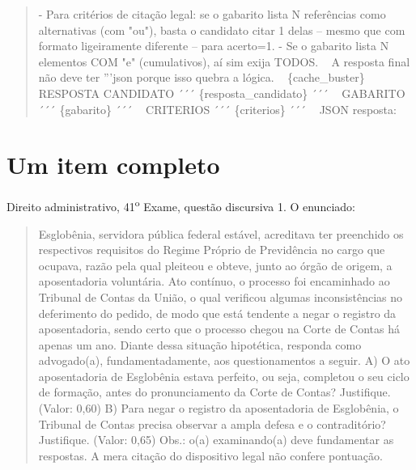 \documentclass{IOS-Book-Article}
\begin{document}
\begin{quote}
- Para critérios de citação legal: se o gabarito lista N referências como alternativas (com "ou"), basta o candidato citar 1 delas -- mesmo que com formato ligeiramente diferente -- para acerto=1.\newline
- Se o gabarito lista N elementos COM "e" (cumulativos), aí sim exija TODOS.\newline
~\newline
A resposta final não deve ter '''json porque isso quebra a lógica.\newline
~\newline
\{cache\_buster\}\newline
~\newline
RESPOSTA CANDIDATO\newline
´´´ \{resposta\_candidato\} ´´´\newline
~\newline
GABARITO\newline
´´´ \{gabarito\} ´´´\newline
~\newline
CRITERIOS\newline
´´´ \{criterios\} ´´´\newline
~\newline
JSON resposta:
\end{quote}

\section{Um item completo}

Direito administrativo, 41\textsuperscript{o} Exame, questão discursiva 1. O enunciado:

\begin{quote}\footnotesize\ttfamily\raggedright
Esglobênia, servidora pública federal estável, acreditava ter preenchido os respectivos requisitos do Regime Próprio de Previdência no cargo que ocupava, razão pela qual pleiteou e obteve, junto ao órgão de origem, a aposentadoria voluntária. Ato contínuo, o processo foi encaminhado ao Tribunal de Contas da União, o qual verificou algumas inconsistências no deferimento do pedido, de modo que está tendente a negar o registro da aposentadoria, sendo certo que o processo chegou na Corte de Contas há apenas um ano. Diante dessa situação hipotética, responda como advogado(a), fundamentadamente, aos questionamentos a seguir. A) O ato aposentadoria de Esglobênia estava perfeito, ou seja, completou o seu ciclo de formação, antes do pronunciamento da Corte de Contas? Justifique. (Valor: 0,60) B) Para negar o registro da aposentadoria de Esglobênia, o Tribunal de Contas precisa observar a ampla defesa e o contraditório? Justifique. (Valor: 0,65) Obs.: o(a) examinando(a) deve fundamentar as respostas. A mera citação do dispositivo legal não confere pontuação.
\end{quote}
\end{document}
